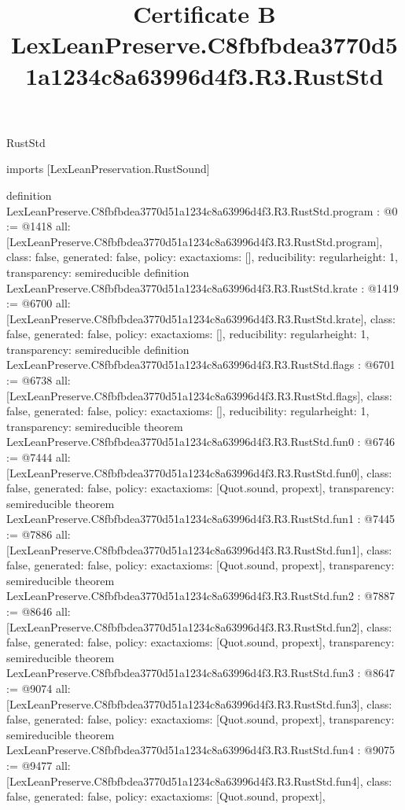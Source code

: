 \begin{lexlean}{RustStd}
\title{Certificate B LexLeanPreserve.C8fbfbdea3770d51a1234c8a63996d4f3.R3.RustStd}
\begin{coremodule}
imports [LexLeanPreservation.RustSound]

definition LexLeanPreserve.C8fbfbdea3770d51a1234c8a63996d4f3.R3.RustStd.program : @0 := @1418 {
  all: [LexLeanPreserve.C8fbfbdea3770d51a1234c8a63996d4f3.R3.RustStd.program],
  class: false,
  generated: false,
  policy: exact{axioms: []},
  reducibility: regular{height: 1},
  transparency: semireducible
}
definition LexLeanPreserve.C8fbfbdea3770d51a1234c8a63996d4f3.R3.RustStd.krate : @1419 := @6700 {
  all: [LexLeanPreserve.C8fbfbdea3770d51a1234c8a63996d4f3.R3.RustStd.krate],
  class: false,
  generated: false,
  policy: exact{axioms: []},
  reducibility: regular{height: 1},
  transparency: semireducible
}
definition LexLeanPreserve.C8fbfbdea3770d51a1234c8a63996d4f3.R3.RustStd.flags : @6701 := @6738 {
  all: [LexLeanPreserve.C8fbfbdea3770d51a1234c8a63996d4f3.R3.RustStd.flags],
  class: false,
  generated: false,
  policy: exact{axioms: []},
  reducibility: regular{height: 1},
  transparency: semireducible
}
theorem LexLeanPreserve.C8fbfbdea3770d51a1234c8a63996d4f3.R3.RustStd.fun0 : @6746 := @7444 {
  all: [LexLeanPreserve.C8fbfbdea3770d51a1234c8a63996d4f3.R3.RustStd.fun0],
  class: false,
  generated: false,
  policy: exact{axioms: [Quot.sound, propext]},
  transparency: semireducible
}
theorem LexLeanPreserve.C8fbfbdea3770d51a1234c8a63996d4f3.R3.RustStd.fun1 : @7445 := @7886 {
  all: [LexLeanPreserve.C8fbfbdea3770d51a1234c8a63996d4f3.R3.RustStd.fun1],
  class: false,
  generated: false,
  policy: exact{axioms: [Quot.sound, propext]},
  transparency: semireducible
}
theorem LexLeanPreserve.C8fbfbdea3770d51a1234c8a63996d4f3.R3.RustStd.fun2 : @7887 := @8646 {
  all: [LexLeanPreserve.C8fbfbdea3770d51a1234c8a63996d4f3.R3.RustStd.fun2],
  class: false,
  generated: false,
  policy: exact{axioms: [Quot.sound, propext]},
  transparency: semireducible
}
theorem LexLeanPreserve.C8fbfbdea3770d51a1234c8a63996d4f3.R3.RustStd.fun3 : @8647 := @9074 {
  all: [LexLeanPreserve.C8fbfbdea3770d51a1234c8a63996d4f3.R3.RustStd.fun3],
  class: false,
  generated: false,
  policy: exact{axioms: [Quot.sound, propext]},
  transparency: semireducible
}
theorem LexLeanPreserve.C8fbfbdea3770d51a1234c8a63996d4f3.R3.RustStd.fun4 : @9075 := @9477 {
  all: [LexLeanPreserve.C8fbfbdea3770d51a1234c8a63996d4f3.R3.RustStd.fun4],
  class: false,
  generated: false,
  policy: exact{axioms: [Quot.sound, propext]},
}
\end{coremodule}
\end{lexlean}
